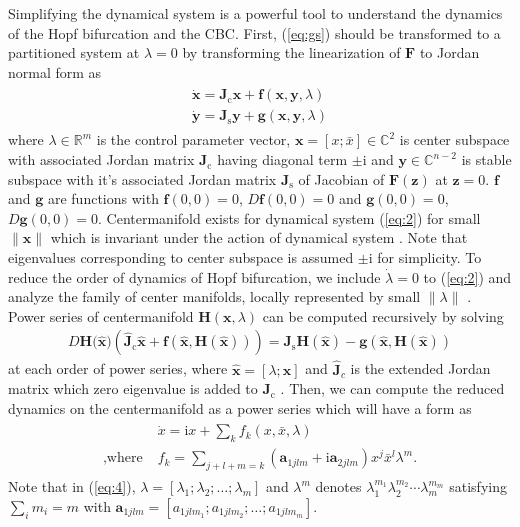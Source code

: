 \documentclass[openacc]{rsproca_new}%
\def\real{\mathbb{R}}
\def\complex{\mathbb{C}}
\def\vec#1{\ensuremath{\mathbf{#1}}}
\newcommand{\Eref}[1]{(\ref{#1})}
\begin{document}
Simplifying the dynamical system is a powerful tool to understand the dynamics of the Hopf bifurcation and the CBC. First, \Eref{eq:gs} should be transformed to a partitioned system at \(\lambda=0\) by transforming the linearization of \(\vec{F}\) to Jordan normal form as
\begin{align}\label{eq:2}
  \begin{split}
    \dot{\vec{x}} =\vec{J}_\textrm{c} \vec{x} + \vec{f}(\vec{x},\vec{y},\lambda)\\
    \dot{\vec{y}} =\vec{J}_\textrm{s} \vec{y} +\vec{g}(\vec{x},\vec{y},\lambda)
  \end{split}
\end{align}
where $\lambda \in \real ^m$ is the control parameter vector, $\vec{x}=[x;\bar{x}]\in \complex^2$ is center subspace with associated Jordan matrix $\vec{J}_\textrm{c}$ having diagonal term $\pm\textrm{i}$ and $\vec{y}\in \complex^{n-2}$ is stable subspace with it's associated Jordan matrix $\vec{J}_\textrm{s}$ of Jacobian of $\vec{F}(\vec{z})$ at $\vec{z}=0$.
$\vec{f}$ and $\vec{g}$ are functions with $\vec{f}(0,0)=0$, $D\vec{f}(0,0)=0$ and $\vec{g}(0,0)=0$, $D\vec{g}(0,0)=0$. Centermanifold exists for dynamical system \Eref{eq:2} for small  $\|\vec{x}\|$ which is invariant under the action of dynamical system \cite{carr2012applications}. Note that eigenvalues corresponding to center subspace is assumed $\pm\textrm{i}$ for simplicity. To reduce the order of dynamics of Hopf bifurcation, we include $\dot\lambda=0$ to \Eref{eq:2} and analyze the family of center manifolds, locally represented by small $\|\lambda\|$  \cite{kuznetsov2013elements}. Power series of centermanifold $\vec{H}(\vec{x},\lambda)$ can be computed recursively by solving
\begin{align}\label{eq:3}
    D\vec{H}({\vec{\hat{x})}}(\vec{\hat{J}}_\textrm{c}\vec{\hat{x}}+\vec{f}(\vec{\hat{x}},\vec{H}(\vec{\hat{x}}))) =\vec{J}_\textrm{s} \vec{H}(\vec{\hat{x}})-\vec{g}(\vec{\hat{x}},\vec{H}(\vec{\hat {x}}))
\end{align}
at each order of power series, where \(\vec{\hat{x}}=[\lambda;\vec{x}]\) and \(\vec{\hat{J}}_c\) is the extended Jordan matrix which zero eigenvalue is added to \(\vec{J}_\textrm{c}\) \cite{bi1999symbolic}. Then, we can compute the reduced dynamics on the centermanifold as a power series which will have a form as
\begin{align}\label{eq:4}
  \begin{split}
    {}&\dot{x} =\textrm{i} x+\sum_k f_k(x,\bar{x},\lambda)\\
    ,\textrm{where} \; & f_k=\sum_{j+l+m=k}(\vec{a}_{1jlm}+\textrm{i}\vec{a}_{2jlm})x^j\bar{x}^l\lambda^m.
  \end{split}
\end{align}
Note that in \Eref{eq:4}, \(\lambda=[\lambda_1;\lambda_2;\ldots;\lambda_m]\) and \(\lambda^m\) denotes \(\lambda_1^{m_1}\lambda_2^{m_2}\cdots\lambda_m^{m_m}\) satisfying \(\sum_i m_i = m\) with \(\vec{a}_{1jlm}=[a_{1jlm_1};a_{1jlm_2};\ldots;a_{1jlm_m}]\).
\end{document}
